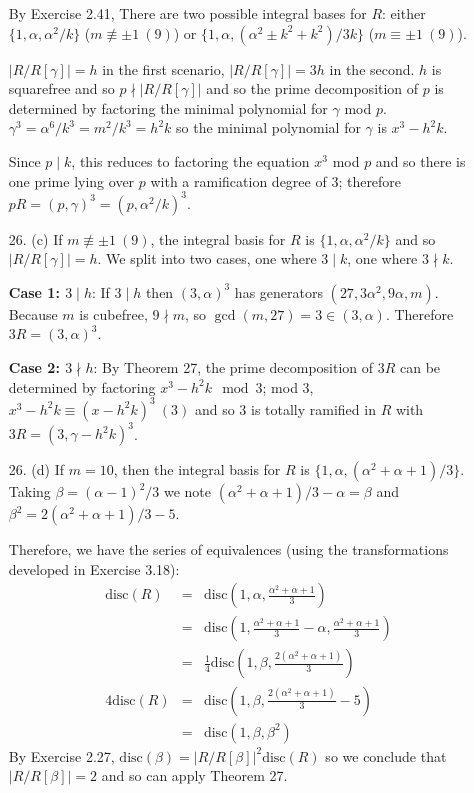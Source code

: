\documentclass{article}
\newcommand{\disc}[1]{\text{disc}(#1)}
\newcommand{\modequiv}[3]{#1 \equiv #2\ (#3)}
\newcommand{\modnotequiv}[3]{#1 \not\equiv #2\ (#3)}
\begin{document}
\begin{enumerate}
By Exercise 2.41, There are two possible integral bases for $R$: either $\{1, \alpha, \alpha^2 / k\}$ ($\modnotequiv{m}{\pm 1}{9}$) or $\{1, \alpha, (\alpha^2 \pm k^2 + k^2)/3k\}$ ($\modequiv{m}{\pm 1}{9}$).

$|R / R[\gamma]| = h$ in the first scenario, $|R / R[\gamma]| = 3h$ in the second.  $h$ is squarefree and so $p \nmid |R/R[\gamma]|$ and so the prime decomposition of $p$ is determined by factoring the minimal polynomial for $\gamma$ mod $p$.  $\gamma^3 = \alpha^6 / k^3 = m^2 / k^3 = h^2k$ so the minimal polynomial for $\gamma$ is $x^3 - h^2 k$.

Since $p \mid k$, this reduces to factoring the equation $x^3$ mod $p$ and so there is one prime lying over $p$ with a ramification degree of 3; therefore $pR = (p, \gamma)^3 = (p, \alpha^2 / k)^3$.

\item[26. (c)] If $\modnotequiv{m}{\pm 1}{9}$, the integral basis for $R$ is $\{1, \alpha, \alpha^2 / k\}$ and so $|R / R[\gamma]| = h$.  We split into two cases, one where $3 \mid k$, one where $3 \nmid k$.

{\bf Case 1: $3 \mid h$}: If $3 \mid h$ then $(3, \alpha)^3$ has generators $(27, 3\alpha^2, 9\alpha, m)$.  Because $m$ is cubefree, $9 \nmid m$, so $\gcd(m, 27) = 3 \in (3, \alpha)$.  Therefore $3R = (3, \alpha)^3$.

{\bf Case 2: $3 \nmid h$}: By Theorem 27, the prime decomposition of $3R$ can be determined by factoring $x^3 - h^2k \mod 3$; mod 3, $x^3 - h^2k \equiv (x - h^2k)^3\ (3)$ and so 3 is totally ramified in $R$ with $3R = (3, \gamma - h^2k)^3$.

\item[26. (d)]  If $m = 10$, then the integral basis for $R$ is $\{1, \alpha, (\alpha^2 + \alpha + 1)/3\}$.  Taking $\beta = (\alpha - 1)^2 / 3$ we note $(\alpha^2 + \alpha + 1) / 3 - \alpha = \beta$ and $\beta^2 = 2(\alpha^2 + \alpha + 1) / 3 - 5$.

Therefore, we have the series of equivalences (using the transformations developed in Exercise 3.18):
\begin{eqnarray*}
    \disc{R} &=& \disc{1, \alpha, \frac{\alpha^2 + \alpha + 1}{3}}\\
             &=& \disc{1, \frac{\alpha^2 + \alpha + 1}{3} - \alpha, \frac{\alpha^2 + \alpha + 1}{3}}\\
             &=& \frac{1}{4} \disc{1, \beta, \frac{2(\alpha^2 + \alpha + 1)}{3}}\\
    4 \disc{R} &=& \disc{1, \beta, \frac{2(\alpha^2 + \alpha + 1)}{3} - 5}\\
             &=& \disc{1, \beta, \beta^2}
\end{eqnarray*}
By Exercise 2.27, $\disc{\beta} = |R/R[\beta]|^2 \disc{R}$ so we conclude that $|R / R[\beta]| = 2$ and so can apply Theorem 27.


\end{enumerate}
\end{document}
